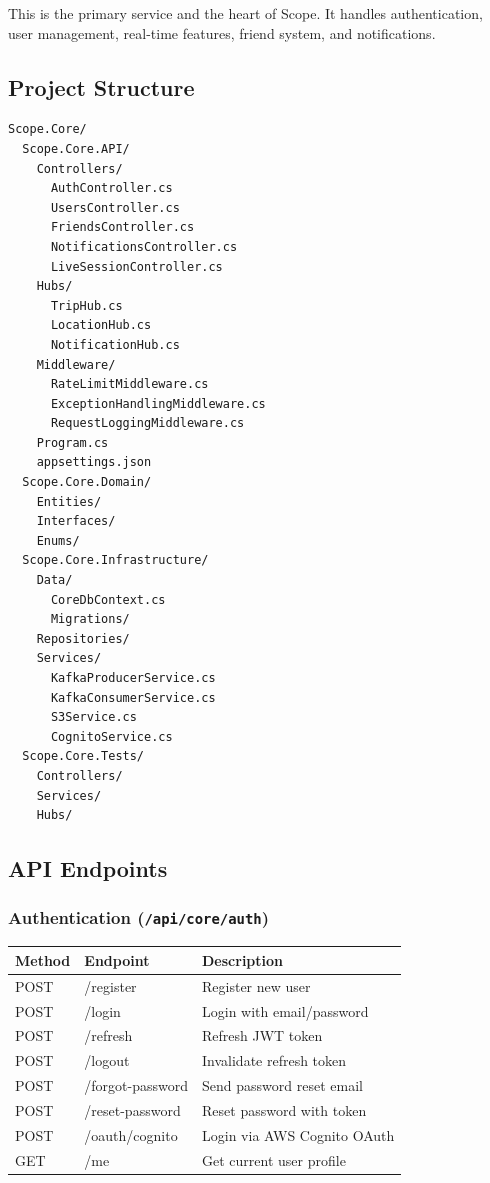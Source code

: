 \documentclass[12pt,letterpaper]{article}
\begin{document}
This is the primary service and the heart of Scope. It handles authentication, user management, real-time features, friend system, and notifications.

\subsection{Project Structure}
\begin{lstlisting}[style=code]
Scope.Core/
  Scope.Core.API/
    Controllers/
      AuthController.cs
      UsersController.cs
      FriendsController.cs
      NotificationsController.cs
      LiveSessionController.cs
    Hubs/
      TripHub.cs
      LocationHub.cs
      NotificationHub.cs
    Middleware/
      RateLimitMiddleware.cs
      ExceptionHandlingMiddleware.cs
      RequestLoggingMiddleware.cs
    Program.cs
    appsettings.json
  Scope.Core.Domain/
    Entities/
    Interfaces/
    Enums/
  Scope.Core.Infrastructure/
    Data/
      CoreDbContext.cs
      Migrations/
    Repositories/
    Services/
      KafkaProducerService.cs
      KafkaConsumerService.cs
      S3Service.cs
      CognitoService.cs
  Scope.Core.Tests/
    Controllers/
    Services/
    Hubs/
\end{lstlisting}

\subsection{API Endpoints}

\subsubsection{Authentication (\texttt{/api/core/auth})}
\begin{tabular}{|l|l|l|}
\hline
\textbf{Method} & \textbf{Endpoint} & \textbf{Description} \\
\hline
POST & /register & Register new user \\
POST & /login & Login with email/password \\
POST & /refresh & Refresh JWT token \\
POST & /logout & Invalidate refresh token \\
POST & /forgot-password & Send password reset email \\
POST & /reset-password & Reset password with token \\
POST & /oauth/cognito & Login via AWS Cognito OAuth \\
GET  & /me & Get current user profile \\
\hline
\end{tabular}
\end{document}
